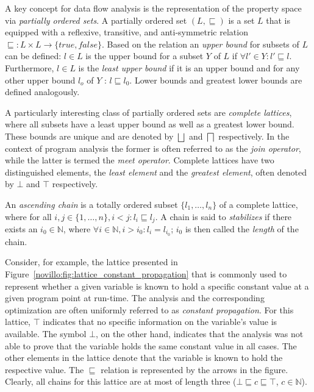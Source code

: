 A key concept for data flow analysis is the representation of the property
space via \emph{partially ordered sets}. A partially ordered set $(L,
\sqsubseteq)$ is a set $L$ that is equipped with a reflexive, transitive, and
anti-symmetric relation $\sqsubseteq: L \times L \rightarrow \{true, false\}$.
Based on the relation an \emph{upper bound} for subsets of $L$ can be defined:
$l \in L$ is the upper bound for a subset $Y$ of $L$ if $\forall l' \in Y: l'
\sqsubseteq l$. Furthermore, $l \in L$ is the \emph{least upper bound} if it is
an upper bound and for any other upper bound $l_o$ of $Y$ : $l \sqsubseteq l_0$.
Lower bounds and greatest lower bounds are defined analogously.

A particularly interesting class of partially ordered sets are \emph{complete
lattices}, where all subsets have a least upper bound as well as a greatest
lower bound. These bounds are unique and are denoted by $\bigsqcup$ and
$\bigsqcap$ respectively. In the context of program analysis the former is often
referred to as the \emph{join operator}, while the latter is termed the
\emph{meet operator}. Complete lattices have two distinguished elements, the
\emph{least element} and the \emph{greatest element}, often denoted by $\bot$
and $\top$ respectively.

An \emph{ascending chain} is a totally ordered subset $\{l_1, \ldots, l_n \}$ of
a complete lattice, where for all $i, j \in \{1, \ldots, n\}, i < j: l_i
\sqsubseteq l_j$. A chain is said to \emph{stabilizes} if there exists an $i_0
\in \mathbb{N}$, where $\forall i \in \mathbb{N}, i > i_0: l_i = l_{i_0}$; $i_0$
is then called the \emph{length} of the chain.

Consider, for example, the lattice presented in
Figure~\ref{novillo:fig:lattice_constant_propagation} that is commonly used to
represent whether a given variable is known to hold a specific constant value at
a given program point at run-time. The analysis and the corresponding
optimization are often uniformly referred to as \emph{constant propagation}.
For this lattice, $\top$ indicates that no specific information on the
variable's value is available. The symbol $\bot$, on the other hand, indicates
that the analysis was not able to prove that the variable holds the same
constant value in all cases. The other elements in the lattice denote that the
variable is known to hold the respective value. The $\sqsubseteq$ relation is
represented by the arrows in the figure. Clearly, all chains for this lattice
are at most of length three ($\bot \sqsubseteq c \sqsubseteq \top$, $c \in
\mathbb{N}$).

